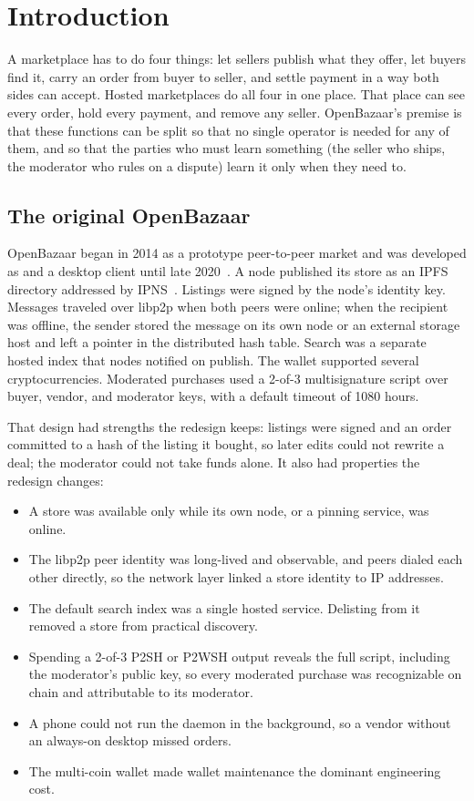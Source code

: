 \section{Introduction}
\label{sec:intro}

A marketplace has to do four things: let sellers publish what they offer, let buyers find it, carry an order from buyer to seller, and settle payment in a way both sides can accept. Hosted marketplaces do all four in one place. That place can see every order, hold every payment, and remove any seller. OpenBazaar's premise is that these functions can be split so that no single operator is needed for any of them, and so that the parties who must learn something (the seller who ships, the moderator who rules on a dispute) learn it only when they need to.

\subsection{The original OpenBazaar}

OpenBazaar began in 2014 as a prototype peer-to-peer market and was developed as  and a desktop client until late 2020~\citep{openbazaargo}. A node published its store as an IPFS directory addressed by IPNS~\citep{ipfs}. Listings were signed by the node's identity key. Messages traveled over libp2p when both peers were online; when the recipient was offline, the sender stored the message on its own node or an external storage host and left a pointer in the distributed hash table. Search was a separate hosted index that nodes notified on publish. The wallet supported several cryptocurrencies. Moderated purchases used a 2-of-3 multisignature script over buyer, vendor, and moderator keys, with a default timeout of 1080 hours.

That design had strengths the redesign keeps: listings were signed and an order committed to a hash of the listing it bought, so later edits could not rewrite a deal; the moderator could not take funds alone. It also had properties the redesign changes:
\begin{itemize}
  \item A store was available only while its own node, or a pinning service, was online.
  \item The libp2p peer identity was long-lived and observable, and peers dialed each other directly, so the network layer linked a store identity to IP addresses.
  \item The default search index was a single hosted service. Delisting from it removed a store from practical discovery.
  \item Spending a 2-of-3 P2SH or P2WSH output reveals the full script, including the moderator's public key, so every moderated purchase was recognizable on chain and attributable to its moderator.
  \item A phone could not run the daemon in the background, so a vendor without an always-on desktop missed orders.
  \item The multi-coin wallet made wallet maintenance the dominant engineering cost.
\end{itemize}

